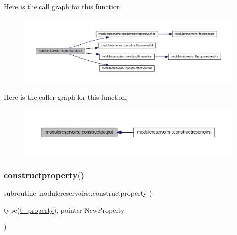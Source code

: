 Here is the call graph for this function\+:\nopagebreak
\begin{figure}[H]
\begin{center}
\leavevmode
\includegraphics[width=350pt]{namespacemodulereservoirs_a43db2f4830b1c886cf024e34a2682edb_cgraph}
\end{center}
\end{figure}
Here is the caller graph for this function\+:\nopagebreak
\begin{figure}[H]
\begin{center}
\leavevmode
\includegraphics[width=350pt]{namespacemodulereservoirs_a43db2f4830b1c886cf024e34a2682edb_icgraph}
\end{center}
\end{figure}
\mbox{\label{namespacemodulereservoirs_a67e585ed4eb36afe43471887a3a9744c}} 
\subsubsection{\texorpdfstring{constructproperty()}{constructproperty()}}
{\footnotesize\ttfamily subroutine modulereservoirs\+::constructproperty (\begin{DoxyParamCaption}\item[{type(\mbox{\hyperlink{structmodulereservoirs_1_1t__property}{t\+\_\+property}}), pointer}]{New\+Property }\end{DoxyParamCaption})\hspace{0.3cm}{\ttfamily [private]}}


